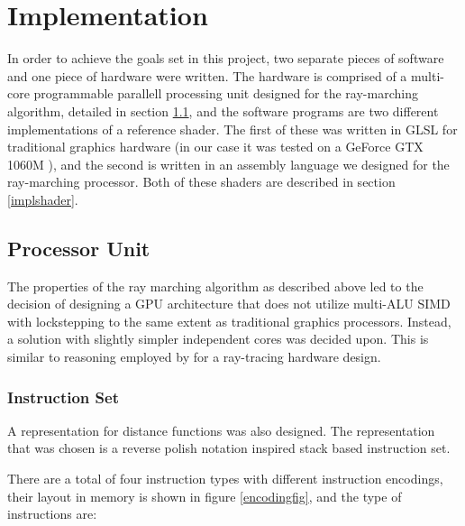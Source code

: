 \chapter{Implementation}
	
	In order to achieve the goals set in this project, two separate pieces of software and one piece of
	hardware were written. The hardware is comprised of a multi-core
	programmable parallell processing unit designed for the ray-marching
	algorithm, detailed in section \ref{implproc}, and the software programs
	are two different implementations of a reference shader.  The first of
	these was written in GLSL for traditional graphics hardware (in our case 
	it was tested on a GeForce GTX 1060M ), and the second is written in an 
	assembly language we designed for the ray-marching processor. Both of 
	these shaders are described in section \ref{implshader}.
	
	\section{Processor Unit} \label{implproc}

		The properties of the ray marching algorithm as described above led to
		the decision of designing a GPU architecture that does not utilize
		multi-ALU SIMD with lockstepping to the same extent as traditional
		graphics processors. Instead, a solution with slightly simpler
		independent cores was decided upon. This is similar to reasoning
		employed by \cite{Woop2005} for a ray-tracing hardware design.
	
		\subsection{Instruction Set}

			A representation for distance functions was also designed. The
			representation that was chosen is a reverse polish notation
			inspired stack based instruction set.
	
			There are a total of four instruction types with different
			instruction encodings, their layout in memory is shown in figure
			\ref{encodingfig}, and the type of instructions are:

